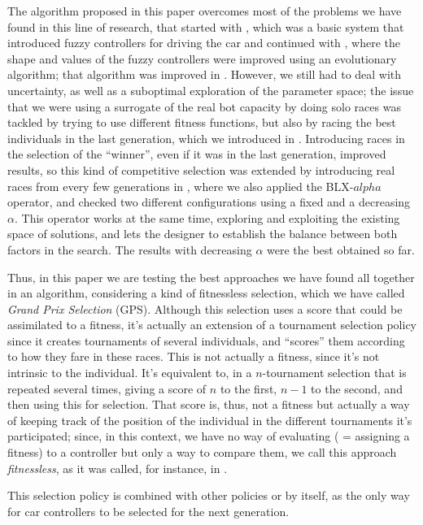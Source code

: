 \documentclass[10pt,journal,compsoc]{IEEEtran}
\begin{document}
The algorithm proposed in this paper overcomes most of the problems we
have found in this line of research, that started with
\cite{salem_evo17}, which was a basic system that
introduced fuzzy controllers for driving the car and continued with
\cite{salem_evo18}, where the shape and values of the
fuzzy controllers were improved using an evolutionary algorithm; that
algorithm was improved in \cite{salem_ipmu18}. However,
we still had to deal with uncertainty, as well as a suboptimal exploration of the parameter space; the issue that we were using a
surrogate of the real bot capacity by doing solo races was tackled by
trying to use different fitness functions, but also by racing the best
individuals in the last generation, which we introduced in
\cite{salem_cig2018}. Introducing races in the selection of the
``winner'', even if it was in the last generation, improved results,
so this kind of competitive selection was extended by introducing real
races from every few generations in 
\cite{DBLP:conf/cig/SalemMG19}, where we also applied the BLX-$alpha$ operator, and checked two different configurations using a fixed and a decreasing $\alpha$. This operator works at the same time, exploring and exploiting the existing space of solutions, and lets the designer to establish the balance between both factors in the search. The results with decreasing $\alpha$ were the best obtained so far.

Thus, in this paper we are testing the best approaches we have found all together in an algorithm, considering a kind of fitnessless selection, which we have called \textit{Grand Prix Selection} (GPS). Although this selection uses a score that could be assimilated to a fitness, it's actually an extension of a tournament selection policy since it creates tournaments of several individuals, and ``scores'' them according to how they fare in these races. This is not actually a fitness, since it's not intrinsic to the individual. It's equivalent to, in a $n$-tournament selection that is repeated several times, giving a score of $n$ to the first, $n-1$ to the second, and then using this for selection. That score is, thus, not a fitness but actually a way of keeping track of the position of the individual in the different tournaments it's participated; since, in this context, we have no way of evaluating ( = assigning a fitness) to a controller but only a way to compare them, we call this approach {\em fitnessless}, as it was called, for instance, in \cite{jaskowski2008winning}.

This selection policy is combined with other policies or by itself, as the only way for car controllers to be selected for the next generation.
\end{document}
